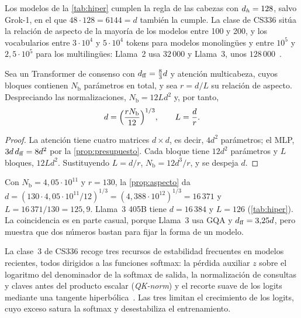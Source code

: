 Los modelos de la \cref{tab:hiper} cumplen la regla de las cabezas con $d_{h}=128$, salvo Grok-1, en el que $48\cdot 128=6144=d$ también la cumple. La clase de CS336 sitúa la relación de aspecto de la mayoría de los modelos entre 100 y 200, y los vocabularios entre $3\cdot 10^{4}$ y $5\cdot 10^{4}$ tokens para modelos monolingües y entre $10^{5}$ y $2{,}5\cdot 10^{5}$ para los multilingües: Llama~2 usa $32\,000$ y Llama~3, unos $128\,000$~\cite{cs336,llama3}.

\begin{proposicion}\label{prop:aspecto}
Sea un Transformer de consenso con $d_{\mathrm{ff}}=\frac83 d$ y atención multicabeza, cuyos bloques contienen $N_{\mathrm{b}}$ parámetros en total, y sea $r=d/L$ su relación de aspecto. Despreciando las normalizaciones, $N_{\mathrm{b}}=12Ld^{2}$ y, por tanto,
\[
d=\Bigl(\frac{rN_{\mathrm{b}}}{12}\Bigr)^{1/3},\qquad L=\frac dr .
\]
\end{proposicion}

\begin{proof}
La atención tiene cuatro matrices $d\times d$, es decir, $4d^{2}$ parámetros; el MLP, $3d\,d_{\mathrm{ff}}=8d^{2}$ por la \cref{prop:presupuesto}. Cada bloque tiene $12d^{2}$ parámetros y $L$ bloques, $12Ld^{2}$. Sustituyendo $L=d/r$, $N_{\mathrm{b}}=12d^{3}/r$, y se despeja $d$.
\end{proof}

\begin{ejemplo}\label{ej:aspecto}
Con $N_{\mathrm{b}}=4{,}05\cdot 10^{11}$ y $r=130$, la \cref{prop:aspecto} da $d=(130\cdot 4{,}05\cdot 10^{11}/12)^{1/3}=(4{,}388\cdot 10^{12})^{1/3}=16\,371$ y $L=16\,371/130=125{,}9$. Llama~3 405B tiene $d=16\,384$ y $L=126$ (\cref{tab:hiper}). La coincidencia es en parte casual, porque Llama~3 usa GQA y $d_{\mathrm{ff}}=3{,}25d$, pero muestra que dos números bastan para fijar la forma de un modelo.
\end{ejemplo}

\begin{observacion}[Estabilidad]
La clase~3 de CS336 recoge tres recursos de estabilidad frecuentes en modelos recientes, todos dirigidos a las funciones softmax: la pérdida auxiliar $z$ sobre el logaritmo del denominador de la softmax de salida, la normalización de consultas y claves antes del producto escalar (\emph{QK-norm}) y el recorte suave de los logits mediante una tangente hiperbólica~\cite{cs336}. Las tres limitan el crecimiento de los logits, cuyo exceso satura la softmax y desestabiliza el entrenamiento.
\end{observacion}

